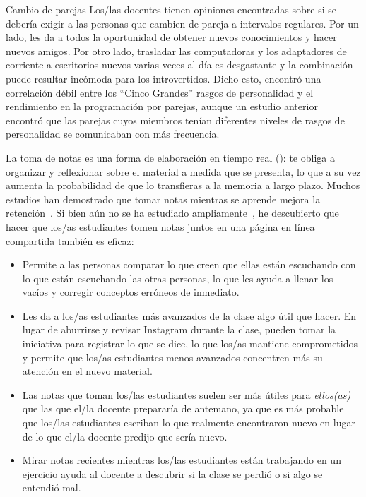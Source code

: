 \begin{aside}{Cambio de parejas}
  Los/las docentes tienen opiniones encontradas sobre si se debería exigir a las personas que cambien de pareja a intervalos regulares.
  Por un lado, les da a todos la oportunidad de obtener nuevos conocimientos y hacer nuevos amigos.
  Por otro lado,
  trasladar las computadoras y los adaptadores de corriente a escritorios nuevos varias veces al día es desgastante
  y la combinación puede resultar incómoda para los introvertidos.
  Dicho esto,
  \cite{Hann2010} encontró una correlación débil entre los ``Cinco Grandes'' rasgos de personalidad 
  y el rendimiento en la programación por parejas,
  aunque un estudio anterior~\cite{Wall2009} encontró que
  las parejas cuyos miembros tenían diferentes niveles de rasgos de personalidad se comunicaban con más frecuencia.
\end{aside}


La toma de notas es una forma de elaboración en tiempo real ():
te obliga a organizar y reflexionar sobre el material a medida que se presenta,
lo que a su vez aumenta la probabilidad de que lo transfieras a la memoria a largo plazo.
Muchos estudios han demostrado que
tomar notas mientras se aprende mejora la retención~\cite{Aike1975,Boha2011}.
Si bien aún no se ha estudiado ampliamente~\cite{Ornd2015,Yang2015},
he descubierto que hacer que los/as estudiantes tomen notas juntos en una página en línea compartida también es eficaz:

\begin{itemize}

\item
  Permite a las personas comparar lo que creen que ellas están escuchando
  con lo que están escuchando las otras personas,
  lo que les ayuda a llenar los vacíos y corregir conceptos erróneos de inmediato.
 
\item
  Les da a los/as estudiantes más avanzados de la clase algo útil que hacer.
  En lugar de aburrirse y revisar Instagram durante la clase,
  pueden tomar la iniciativa para registrar lo que se dice,
  lo que los/as mantiene comprometidos
  y permite que los/as estudiantes menos avanzados concentren más su atención en el nuevo material.
 
\item
  Las notas que toman los/las estudiantes suelen ser más útiles para \emph{ellos(as)}
  que las que el/la docente prepararía de antemano,
  ya que es más probable que los/las estudiantes escriban lo que realmente encontraron nuevo
  en lugar de lo que el/la docente predijo que sería nuevo.

\item
  Mirar notas recientes mientras los/las estudiantes están trabajando en un ejercicio
  ayuda al docente a descubrir si la clase se perdió o si algo se entendió mal.
 
\end{itemize}

